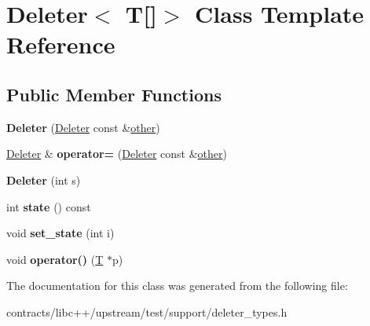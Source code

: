 \hypertarget{class_deleter_3_01_t[]_4}{}\section{Deleter$<$ T\mbox{[}\mbox{]}$>$ Class Template Reference}
\label{class_deleter_3_01_t[]_4}
\subsection*{Public Member Functions}
\begin{DoxyCompactItemize}
\item 
\mbox{\label{class_deleter_3_01_t[]_4_aefa70bd982196890bea70b8f7e500a2f}} 
{\bfseries Deleter} (\mbox{\hyperlink{struct_deleter}{Deleter}} const \&\mbox{\hyperlink{structother}{other}})
\item 
\mbox{\label{class_deleter_3_01_t[]_4_aff561018b74db76527d9a19cd1431b22}} 
\mbox{\hyperlink{struct_deleter}{Deleter}} \& {\bfseries operator=} (\mbox{\hyperlink{struct_deleter}{Deleter}} const \&\mbox{\hyperlink{structother}{other}})
\item 
\mbox{\label{class_deleter_3_01_t[]_4_afc987eb2ae177110cc05aa9bb8b4a624}} 
{\bfseries Deleter} (int s)
\item 
\mbox{\label{class_deleter_3_01_t[]_4_aa485b1ba2ec1427706c9af6d8f8e2fc1}} 
int {\bfseries state} () const
\item 
\mbox{\label{class_deleter_3_01_t[]_4_aa1c3b7dff6b65fa6656bc5d515f0f886}} 
void {\bfseries set\+\_\+state} (int i)
\item 
\mbox{\label{class_deleter_3_01_t[]_4_aeab9c0be395b0c7aaa1bce4fc686f698}} 
void {\bfseries operator()} (\mbox{\hyperlink{struct_t}{T}} $\ast$p)
\end{DoxyCompactItemize}


The documentation for this class was generated from the following file\+:\begin{DoxyCompactItemize}
\item 
contracts/libc++/upstream/test/support/deleter\+\_\+types.\+h\end{DoxyCompactItemize}
